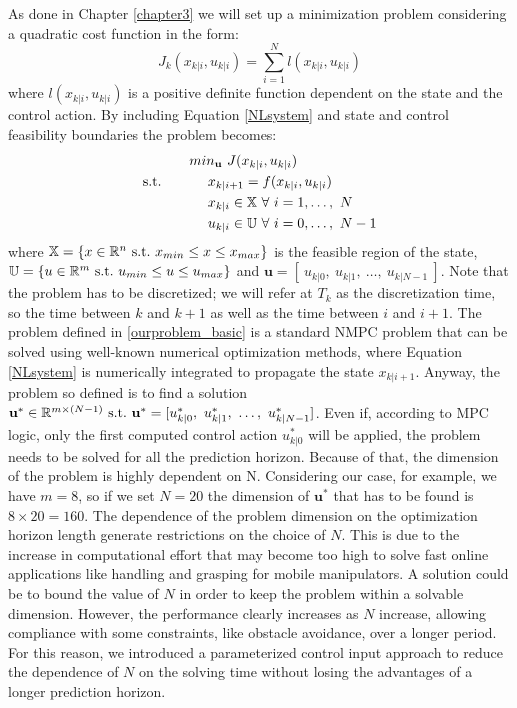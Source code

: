 As done in Chapter \ref{chapter3} we will set up a minimization problem considering a quadratic cost function in the form:
\begin{equation}
J_{k}({x}_{k|i},{u}_{k|i})=\sum_{i=1}^{N}l({x}_{k|i},{u}_{k|i})
\end{equation} 
where $l({x}_{k|i},{u}_{k|i})$ is a positive definite function dependent on the state and the control action. By including Equation \ref{NLsystem} and state and control feasibility boundaries the problem becomes: 
\begin{equation} \label{ourproblem_basic}
\begin{split}
		& min_{\textbf{u}}\ J({x}_{k|i},{u}_{k|i}) \\
		\textnormal{s.t.}\qquad
		&\ \ \ \ x_{k|i+1}=f(x_{k|i},u_{k|i}) \\
		&\ \ \ \ {x}_{k|i} \in \mathbb{X}\ \forall\ i=1,\dots,\ N  \\
		&\ \ \ \ {u}_{k|i} \in \mathbb{U}\ \forall\ i=0,\dots,\ N-1 \\
	\end{split}	
\end{equation}
where $\mathbb{X} = \lbrace {x}\in \mathbb{R}^n\ \textnormal{s.t.}\ {x}_{min}\leq x\leq x_{max} \rbrace$ is the feasible region of the state, $\mathbb{U} = \lbrace {u}\in \mathbb{R}^m\ \textnormal{s.t.}\ {u}_{min}\leq{u}\leq{u}_{max} \rbrace $ and $\textbf{u}=[\ u_{k|0},\ u_{k|1},\ \dots,\ u_{k|N-1}\ ]$.
Note that the problem has to be discretized; we will refer at $T_k$ as the discretization time, so the time between $k$ and $k+1$ as well as the time between $i$ and $i+1$.
The problem defined in \ref{ourproblem_basic} is a standard NMPC problem that can be solved using well-known numerical optimization methods, where Equation \ref{NLsystem} is numerically integrated to propagate the state ${x}_{k|i+1}$. Anyway, the problem so defined is to find a solution $\textbf{u}^* \in \mathbb{R}^{m\times(N-1)}\ \textnormal{s.t.}\ \textbf{u}^* =[{u}^*_{k|0},\ {u}^*_{k|1},\ \dots,\ {u}^*_{k|N-1}]$. Even if, according to MPC logic, only the first computed control action ${u}^*_{k|0}$ will be applied, the problem needs to be solved for all the prediction horizon. Because of that, the dimension of the problem is highly dependent on N. Considering our case, for example, we have $m=8$, so if we set $N=20$ the dimension of $\textbf{u}^*$ that has to be found is $8\times20=160$. The dependence of the problem dimension on the optimization horizon length generate restrictions on the choice of $N$. This is due to the increase in computational effort that may become too high to solve fast online applications like handling and grasping for mobile manipulators. A solution could be to bound the value of $N$ in order to keep the problem within a solvable dimension. However, the performance clearly increases as $N$ increase, allowing compliance with some constraints, like obstacle avoidance, over a longer period. For this reason, we introduced a parameterized control input approach to reduce the dependence of $N$ on the solving time without losing the advantages of a longer prediction horizon.

